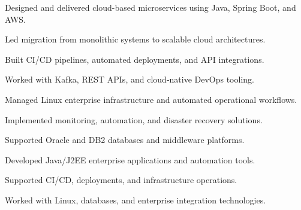 \documentclass[letterpaper]{deedy-resume} %
\begin{document}
\begin{minipage}[t]{0.66\textwidth}
\sectionspace

\begin{tightitemize}
\item Designed and delivered cloud-based microservices using Java, Spring Boot, and AWS.
\item Led migration from monolithic systems to scalable cloud architectures.
\item Built CI/CD pipelines, automated deployments, and API integrations.
\item Worked with Kafka, REST APIs, and cloud‑native DevOps tooling.
\end{tightitemize}

\sectionspace

\begin{tightitemize}
\item Managed Linux enterprise infrastructure and automated operational workflows.
\item Implemented monitoring, automation, and disaster recovery solutions.
\item Supported Oracle and DB2 databases and middleware platforms.
\end{tightitemize}

\sectionspace

\begin{tightitemize}
\item Developed Java/J2EE enterprise applications and automation tools.
\item Supported CI/CD, deployments, and infrastructure operations.
\item Worked with Linux, databases, and enterprise integration technologies.
\end{tightitemize}



\sectionspace %



\end{minipage}
\end{document}
